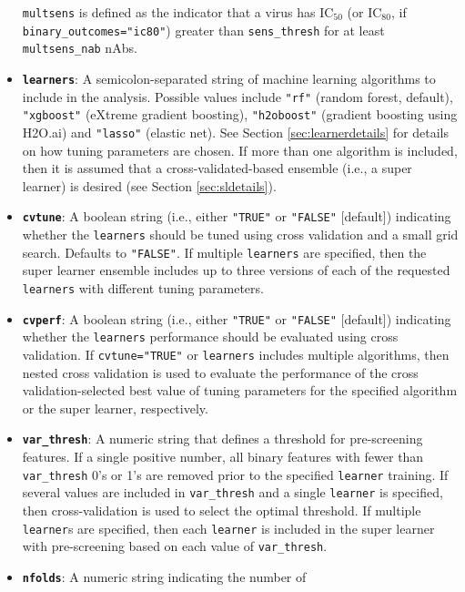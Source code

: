 \documentclass[]{article}
\begin{document}
\begin{itemize}
  \texttt{multsens} is defined as the indicator that a virus has
  IC\(_{50}\) (or IC\(_{80}\), if \texttt{binary\_outcomes="ic80"})
  greater than \texttt{sens\_thresh} for at least \texttt{multsens\_nab}
  nAbs.
\item
  \textbf{\texttt{learners}}: A semicolon-separated string of machine
  learning algorithms to include in the analysis. Possible values
  include \texttt{"rf"} (random forest, default), \texttt{"xgboost"}
  (eXtreme gradient boosting), \texttt{"h2oboost"} (gradient boosting
  using H2O.ai) and \texttt{"lasso"} (elastic net). See Section
  \ref{sec:learnerdetails} for details on how tuning parameters are
  chosen. If more than one algorithm is included, then it is assumed
  that a cross-validated-based ensemble (i.e., a super learner) is
  desired (see Section \ref{sec:sldetails}).
\item
  \textbf{\texttt{cvtune}}: A boolean string (i.e., either
  \texttt{"TRUE"} or \texttt{"FALSE"} {[}default{]}) indicating whether
  the \texttt{learners} should be tuned using cross validation and a
  small grid search. Defaults to \texttt{"FALSE"}. If multiple
  \texttt{learners} are specified, then the super learner ensemble
  includes up to three versions of each of the requested
  \texttt{learners} with different tuning parameters.
\item
  \textbf{\texttt{cvperf}}: A boolean string (i.e., either
  \texttt{"TRUE"} or \texttt{"FALSE"} {[}default{]}) indicating whether
  the \texttt{learners} performance should be evaluated using cross
  validation. If \texttt{cvtune="TRUE"} or \texttt{learners} includes
  multiple algorithms, then nested cross validation is used to evaluate
  the performance of the cross validation-selected best value of tuning
  parameters for the specified algorithm or the super learner,
  respectively.
\item
  \textbf{\texttt{var\_thresh}}: A numeric string that defines a
  threshold for pre-screening features. If a single positive number, all
  binary features with fewer than \texttt{var\_thresh} 0's or 1's are
  removed prior to the specified \texttt{learner} training. If several
  values are included in \texttt{var\_thresh} and a single
  \texttt{learner} is specified, then cross-validation is used to select
  the optimal threshold. If multiple \texttt{learner}s are specified,
  then each \texttt{learner} is included in the super learner with
  pre-screening based on each value of \texttt{var\_thresh}.
\item
  \textbf{\texttt{nfolds}}: A numeric string indicating the number of

\end{itemize}
\end{document}
